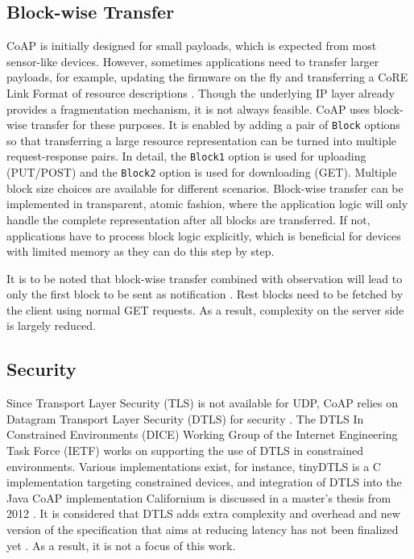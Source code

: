 \subsection{Block-wise Transfer} \label{blockwise_transfer}

CoAP is initially designed for small payloads, which is expected from most sensor-like devices. However, sometimes applications need to transfer larger payloads, for example, updating the firmware on the fly and transferring a CoRE Link Format of resource descriptions \autocite{core_link}. Though the underlying IP layer already provides a fragmentation mechanism, it is not always feasible. CoAP uses block-wise transfer \autocite{blockwise} for these purposes. It is enabled by adding a pair of \verb|Block| options so that transferring a large resource representation can be turned into multiple request-response pairs. In detail, the \verb|Block1| option is used for uploading (PUT/POST) and the \verb|Block2| option is used for downloading (GET). Multiple block size choices are available for different scenarios. Block-wise transfer can be implemented in transparent, atomic fashion, where the application logic will only handle the complete representation after all blocks are transferred. If not, applications have to process block logic explicitly, which is beneficial for devices with limited memory as they can do this step by step.
 
 It is to be noted that block-wise transfer combined with observation will lead to only the first block to be sent as notification \autocite{blockwise}. Rest blocks need to be fetched by the client using normal GET requests. As a result, complexity on the server side is largely reduced.

\subsection{Security}\label{security}

Since Transport Layer Security (TLS) is not available for UDP, CoAP relies on Datagram Transport Layer Security (DTLS)  for security \autocite{dtls1.2, coap_protocol}. The DTLS In Constrained Environments (DICE) Working Group of the Internet Engineering Task Force (IETF) works on supporting the use of DTLS in constrained environments. Various implementations exist, for instance, tinyDTLS \autocite{tinydtls} is a C implementation targeting constrained devices, and integration of DTLS into the Java CoAP implementation Californium \autocite{californium} is discussed in a master's thesis from 2012 \autocite{jucker2012securing}. It is considered that DTLS adds extra complexity and overhead and new version of the specification that aims at reducing latency has not been finalized yet \autocite{kovatsch2015scalable}. As a result, it is not a focus of this work.




